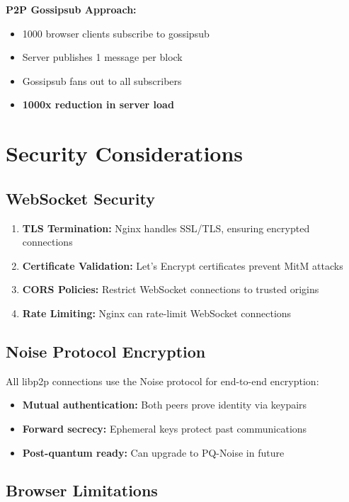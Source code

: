 \documentclass[11pt,a4paper]{article}
\begin{document}
\textbf{P2P Gossipsub Approach:}
\begin{itemize}
    \item 1000 browser clients subscribe to gossipsub
    \item Server publishes 1 message per block
    \item Gossipsub fans out to all subscribers
    \item \textbf{1000x reduction in server load}
\end{itemize}

\section{Security Considerations}

\subsection{WebSocket Security}

\begin{enumerate}
    \item \textbf{TLS Termination:} Nginx handles SSL/TLS, ensuring encrypted connections
    \item \textbf{Certificate Validation:} Let's Encrypt certificates prevent MitM attacks
    \item \textbf{CORS Policies:} Restrict WebSocket connections to trusted origins
    \item \textbf{Rate Limiting:} Nginx can rate-limit WebSocket connections
\end{enumerate}

\subsection{Noise Protocol Encryption}

All libp2p connections use the Noise protocol for end-to-end encryption:

\begin{itemize}
    \item \textbf{Mutual authentication:} Both peers prove identity via keypairs
    \item \textbf{Forward secrecy:} Ephemeral keys protect past communications
    \item \textbf{Post-quantum ready:} Can upgrade to PQ-Noise in future
\end{itemize}

\subsection{Browser Limitations}
\end{document}

